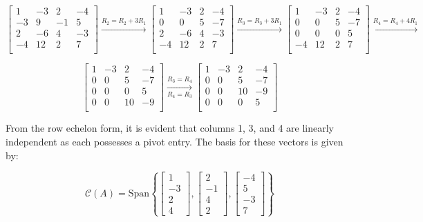 \documentclass[letter,11pt]{article}
\theoremstyle{definition}
\begin{document}
\begin{tcolorbox}[boxrule=1mm, width=(\linewidth),before=\hfill,after=\hfill,adjusted title={Problem 5 Solutions}]

$$\begin{bmatrix}
1 & -3 & 2 & -4 \\
-3 & 9 & -1 & 5 \\
2 & -6 & 4 & -3 \\
-4 & 12 & 2 & 7 \\
\end{bmatrix} \xrightarrow{R_2 = R_2 + 3R_1}
\begin{bmatrix}
1 & -3 & 2 & -4 \\
0 & 0 & 5 & -7 \\
2 & -6 & 4 & -3 \\
-4 & 12 & 2 & 7 \\
\end{bmatrix}\xrightarrow{R_3 = R_3 +3R_1}
\begin{bmatrix}
1 & -3 & 2 & -4 \\
0 & 0 & 5 & -7 \\
0 & 0 & 0 & 5 \\
-4 & 12 & 2 & 7 \\
\end{bmatrix}\xrightarrow{R_4 = R_4 +4R_1}$$

$$\begin{bmatrix}
1 & -3 & 2 & -4 \\
0 & 0 & 5 & -7 \\
0 & 0 & 0 & 5 \\
0 & 0 & 10 & -9 \\
\end{bmatrix}\xrightarrow[R_4 = R_3]{R_3=R_4}
\begin{bmatrix}
1 & -3 & 2 & -4 \\
0 & 0 & 5 & -7 \\
0 & 0 & 10 & -9 \\
0 & 0 & 0 & 5 \\
\end{bmatrix}$$
\tcblower

From the row echelon form, it is evident that columns 1, 3, and 4 are linearly independent as each possesses a pivot entry. The basis for these vectors is given by:

$$\mathcal{C}(A) = \text{Span}\left\{
\begin{bmatrix}
1 \\ -3 \\ 2 \\ 4
\end{bmatrix},
\begin{bmatrix}
2 \\ -1 \\ 4 \\ 2
\end{bmatrix},
\begin{bmatrix}
-4 \\ 5 \\ -3 \\ 7
\end{bmatrix}
\right\}$$


\end{tcolorbox}
\end{document}
